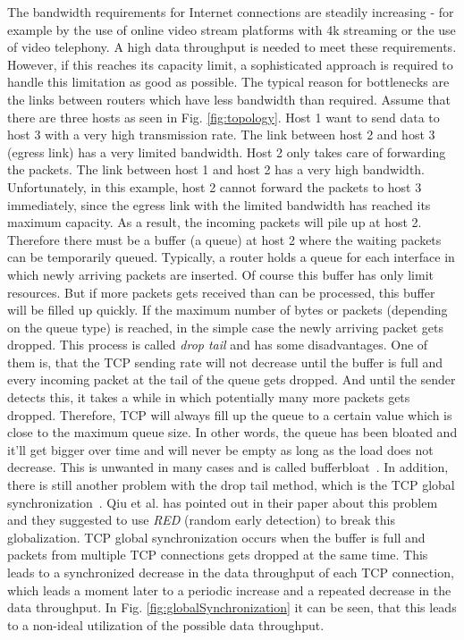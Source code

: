 The bandwidth requirements for Internet connections are steadily increasing - for example by the use of online video stream platforms with 4k streaming or the use of video telephony. A high data throughput is needed to meet these requirements. However, if this reaches its capacity limit, a sophisticated approach is required to handle this limitation as good as possible. \newline
The typical reason for bottlenecks are the links between routers which have less bandwidth than required. Assume that there are three hosts as seen in Fig. \ref{fig:topology}. Host 1 want to send data to host 3 with a very high transmission rate. The link between host 2 and host 3 (egress link) has a very limited bandwidth. Host 2 only takes care of forwarding the packets. The link between host 1 and host 2 has a very high bandwidth.\newline 
Unfortunately, in this example, host 2 cannot forward the packets to host 3 immediately, since the egress link with the limited bandwidth has reached its maximum capacity.  As a result, the incoming packets will pile up at host 2. Therefore there must be a buffer (a queue) at host 2 where the waiting packets can be temporarily queued. Typically, a router holds a queue for each interface in which newly arriving packets are inserted. Of course this buffer has only limit resources. But if more packets gets received than can be processed, this buffer will be filled up quickly. If the maximum number of bytes or packets (depending on the queue type) is reached, in the simple case the newly arriving packet gets dropped. This process is called \textit{drop tail} and has some disadvantages. \newline
One of them is, that the TCP sending rate will not decrease until the buffer is full and every incoming packet at the tail of the queue gets dropped. And until the sender detects this, it takes a while in which potentially many more packets gets dropped. Therefore, TCP will always fill up the queue to a certain value which is close to the maximum queue size. In other words, the queue has been bloated and it'll get bigger over time and will never be empty as long as the load does not decrease. This is unwanted in many cases and is called bufferbloat~\cite{jiang2012understanding}.\newline
In addition, there is still another problem with the drop tail method, which is the TCP global synchronization~\cite{qiu2001understanding}. Qiu et al. has pointed out in their paper about this problem and they suggested to use \textit{RED} (random early detection) to break this globalization. TCP global synchronization occurs when the buffer is full and packets from multiple TCP connections gets dropped at the same time. This leads to a synchronized decrease in the data throughput of each TCP connection, which leads a moment later to a periodic increase and a repeated decrease in the data throughput. In Fig. \ref{fig:globalSynchronization} it can be seen, that this leads to a non-ideal utilization of the possible data throughput.

